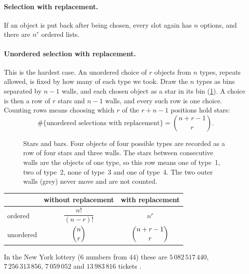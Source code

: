 \paragraph{Selection with replacement.} If an object is put back after being
chosen, every slot again has $n$ options, and there are $n^r$ ordered lists.

\paragraph{Unordered selection with replacement.} This is the hardest case.
An unordered choice of $r$ objects from $n$ types, repeats allowed, is fixed by
how many of each type we took. Draw the $n$ types as bins separated by $n-1$
walls, and each chosen object as a star in its bin (\cref{1a:fig:stars}). A
choice is then a row of $r$ stars and $n-1$ walls, and every such row is one
choice. Counting rows means choosing which $r$ of the $r+n-1$ positions hold
stars:
\begin{equation}
\#\{\text{unordered selections with replacement}\}=\binom{n+r-1}{r}.
\label{1a:eq:stars}
\end{equation}

\begin{figure}[htbp]
\centering
{}
\caption{Stars and bars. Four objects of four possible types are recorded as
a row of four stars and three walls. The stars between consecutive walls are
the objects of one type, so this row means one of type~1, two of type~2, none
of type~3 and one of type~4. The two outer walls (grey) never move and are not
counted.}
\label{1a:fig:stars}
\end{figure}

\begin{keyidea}
\centering
\begin{tabular}{@{}lcc@{}}
\toprule
 & without replacement & with replacement\\
\midrule
ordered & $\dfrac{n!}{(n-r)!}$ & $n^r$\\[2ex]
unordered & $\dbinom nr$ & $\dbinom{n+r-1}{r}$\\
\bottomrule
\end{tabular}
\par\smallskip\raggedright
In the New York lottery ($6$ numbers from $44$) these are
$5\,082\,517\,440$, $7\,256\,313\,856$, $7\,059\,052$ and $13\,983\,816$ tickets
.
\end{keyidea}

